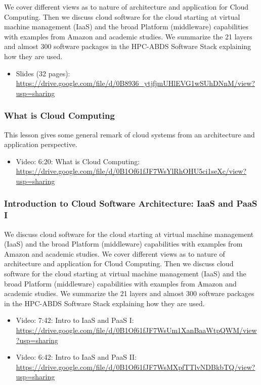 We cover different views as to nature of architecture and application
for Cloud Computing. Then we discuss cloud software for the cloud
starting at virtual machine management (IaaS) and the broad Platform
(middleware) capabilities with examples from Amazon and academic
studies. We summarize the 21 layers and almost 300 software packages in
the HPC-ABDS Software Stack explaining how they are used.

\begin{itemize}
\tightlist
\item
  Slides (32 pages):
  \url{https://drive.google.com/file/d/0B8936_ytjfjmUHlEVG1wSUhDNnM/view?usp=sharing}
\end{itemize}

\subsubsection{What is Cloud Computing}\label{what-is-cloud-computing}

This lesson gives some general remark of cloud systems from an
architecture and application perspective.

\begin{itemize}
\tightlist
\item
  Video: 6:20: What is Cloud Computing:
  \url{https://drive.google.com/file/d/0B1Of61fJF7WsYlRhOHU5ci1seXc/view?usp=sharing}
\end{itemize}

\subsubsection{Introduction to Cloud Software Architecture: IaaS and
PaaS
I}\label{introduction-to-cloud-software-architecture-iaas-and-paas-i}

We discuss cloud software for the cloud starting at virtual machine
management (IaaS) and the broad Platform (middleware) capabilities with
examples from Amazon and academic studies. We cover different views as
to nature of architecture and application for Cloud Computing. Then we
discuss cloud software for the cloud starting at virtual machine
management (IaaS) and the broad Platform (middleware) capabilities with
examples from Amazon and academic studies. We summarize the 21 layers
and almost 300 software packages in the HPC-ABDS Software Stack
explaining how they are used.

\begin{itemize}
\tightlist
\item
  Video: 7:42: Intro to IaaS and PaaS I:
  \url{https://drive.google.com/file/d/0B1Of61fJF7WsUm1XanBaaWtpQWM/view?usp=sharing}
\item
  Video: 6:42: Intro to IaaS and PaaS II:
  \url{https://drive.google.com/file/d/0B1Of61fJF7WsMXpfTTlvNDBkbTQ/view?usp=sharing}
\end{itemize}

